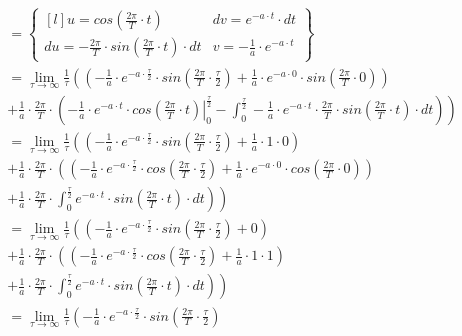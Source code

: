 \begin{align*}
 &=\begin{Bmatrix*}[l]
 u=cos(\frac{2\pi}{T}\cdot t) & dv = e^{-a \cdot t}\cdot dt\\ 
 du=-\frac{2\pi}{T} \cdot sin(\frac{2\pi}{T}\cdot t)\cdot dt & v=-\frac{1}{a}\cdot e^{-a\cdot t}
 \end{Bmatrix*}\\
 &=\lim_{\tau \rightarrow \infty }\frac{1}{\tau}\left(
 \left( -\frac{1}{a}\cdot e^{-a\cdot \frac{\tau}{2}} \cdot sin \left(\frac{2\pi}{T}\cdot \frac{\tau}{2}\right) + \frac{1}{a}\cdot e^{-a\cdot 0} \cdot sin \left(\frac{2\pi}{T}\cdot 0\right) \right)\right.\\
 &\left.+\frac{1}{a} \cdot \frac{2\pi}{T} \cdot 
 \left(
 \left. -\frac{1}{a}\cdot e^{-a\cdot t} \cdot cos \left(\frac{2\pi}{T}\cdot t\right) \right|_{0}^{\frac{\tau}{2}}
 -\int_{0}^{\frac{\tau}{2}} -\frac{1}{a}\cdot e^{-a\cdot t} \cdot \frac{2\pi}{T} \cdot sin\left(\frac{2\pi}{T}\cdot t\right)\cdot dt
 \right)
 \right)\\
 &=\lim_{\tau \rightarrow \infty }\frac{1}{\tau}\left(
 \left( -\frac{1}{a}\cdot e^{-a\cdot \frac{\tau}{2}} \cdot sin \left(\frac{2\pi}{T}\cdot \frac{\tau}{2}\right) + \frac{1}{a}\cdot 1 \cdot 0 \right)\right.\\
 &\left.+\frac{1}{a} \cdot \frac{2\pi}{T} \cdot 
 \left(
 \left( -\frac{1}{a}\cdot e^{-a\cdot \frac{\tau}{2}} \cdot cos \left(\frac{2\pi}{T}\cdot \frac{\tau}{2}\right) + \frac{1}{a}\cdot e^{-a\cdot 0} \cdot cos \left(\frac{2\pi}{T}\cdot 0\right) \right)
 \right.\right. \\
 &\left.\left.+\frac{1}{a}\cdot \frac{2\pi}{T} \cdot \int_{0}^{\frac{\tau}{2}} e^{-a\cdot t} \cdot  sin\left(\frac{2\pi}{T}\cdot t\right)\cdot dt
 \right)
 \right)\\
 &=\lim_{\tau \rightarrow \infty }\frac{1}{\tau}\left(
 \left( -\frac{1}{a}\cdot e^{-a\cdot \frac{\tau}{2}} \cdot sin \left(\frac{2\pi}{T}\cdot \frac{\tau}{2}\right) + 0 \right)\right.\\
 &\left.+\frac{1}{a} \cdot \frac{2\pi}{T} \cdot 
 \left(
 \left( -\frac{1}{a}\cdot e^{-a\cdot \frac{\tau}{2}} \cdot cos \left(\frac{2\pi}{T}\cdot \frac{\tau}{2}\right) + \frac{1}{a}\cdot 1 \cdot 1 \right)
 \right.\right. \\
 &\left.\left.+\frac{1}{a}\cdot \frac{2\pi}{T} \cdot \int_{0}^{\frac{\tau}{2}} e^{-a\cdot t} \cdot  sin\left(\frac{2\pi}{T}\cdot t\right)\cdot dt
 \right)
 \right)\\
 &=\lim_{\tau \rightarrow \infty }\frac{1}{\tau}\left(
 -\frac{1}{a}\cdot e^{-a\cdot \frac{\tau}{2}} \cdot sin \left(\frac{2\pi}{T}\cdot \frac{\tau}{2}\right)\right.\\

\end{align*}
